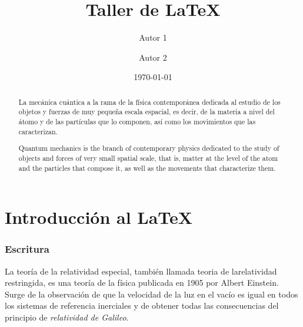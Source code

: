 \documentclass[12pt,a4paper]{article}
\title{Taller de \LaTeX}
\author{Autor 1\and Autor 2}
\date{\today}
\begin{document}
\maketitle
\newpage

\tableofcontents
\newpage
\begin{abstract}
La mecánica cuántica a la rama de la física contemporánea dedicada al estudio de los objetos y fuerzas de muy pequeña escala espacial, es decir, de la materia a nivel del átomo y de las partículas que lo componen, así como los movimientos que las caracterizan.
\end{abstract}
\renewcommand{\abstractname}{Abstract}
\begin{abstract}
Quantum mechanics is the branch of contemporary physics dedicated to the study of objects and forces of very small spatial scale, that is, matter at the level of the atom and the particles that compose it, as well as the movements that characterize them.
\end{abstract}

\part{Introducción al \LaTeX}
\section{Escritura}\label{introduccion}
La teoría de la relatividad especial, también llamada teoria de la\linebreak relatividad restringida, es una teoría de la física publicada en 1905 por Albert Einstein. Surge de la observación de que la velocidad de la luz en el vacío es igual en todos los sistemas de referencia inerciales y de obtener todas las consecuencias del principio de {\it \large relatividad de Galileo}.
\end{document}
